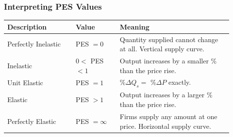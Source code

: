 \documentclass[11pt, a4paper, twoside]{book}
\begin{document}
\subsubsection{Interpreting PES Values}

\begin{tcolorbox}[enhanced,colback=LightBlue,colframe=MidBlue!70,arc=0pt,boxrule=0.8pt]
\begin{tabular}{@{}>{\RaggedRight\arraybackslash}p{0.28\linewidth}>{\RaggedRight\arraybackslash}p{0.18\linewidth}>{\RaggedRight\arraybackslash}p{0.46\linewidth}@{}}
\textbf{\color{NavyPrimary}Description} & \textbf{\color{NavyPrimary}Value} & \textbf{\color{NavyPrimary}Meaning} \\
\midrule
Perfectly Inelastic & PES $= 0$ & Quantity supplied cannot change at all. Vertical supply curve. \\
Inelastic & $0 <$ PES $< 1$ & Output increases by a smaller \% than the price rise. \\
Unit Elastic & PES $= 1$ & \%$\Delta Q_s =$ \%$\Delta P$ exactly. \\
Elastic & PES $> 1$ & Output increases by a larger \% than the price rise. \\
Perfectly Elastic & PES $= \infty$ & Firms supply any amount at one price. Horizontal supply curve. \\
\end{tabular}
\end{tcolorbox}
\end{document}
